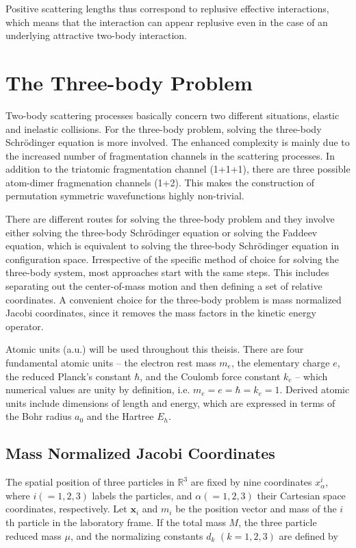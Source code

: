 \documentclass{article}
\numberwithin{equation}{section}
\numberwithin{figure}{section}
\begin{document}
Positive scattering lengths thus correspond to replusive effective interactions, which means that the interaction can appear replusive even in the case of an underlying attractive two-body interaction.

\section{The Three-body Problem} 
Two-body scattering processes basically concern two different situations, elastic and inelastic collisions. For the three-body problem, solving the three-body Schr{\"o}dinger equation is more involved. The enhanced complexity is mainly due to the increased number of fragmentation channels in the scattering processes. In addition to the triatomic fragmentation channel (1+1+1), there are three possible atom-dimer fragmenation channels (1+2). This makes the construction of permutation symmetric wavefunctions highly non-trivial. 

There are different routes for solving the three-body problem and they involve either solving the three-body Schr{\"o}dinger equation or solving the Faddeev equation, which is equivalent to solving the three-body Schr{\"o}dinger equation in configuration space. Irrespective of the specific method of choice for solving the three-body system, most approaches start with the same steps. This includes separating out the center-of-mass motion and then defining a set of relative coordinates. A convenient choice for the three-body problem is mass normalized Jacobi coordinates, since it removes the mass factors in the kinetic energy operator. 

Atomic units (a.u.) will be used throughout this theisis. There are four fundamental atomic units -- the electron rest mass $m_e$, the elementary charge $e$, the reduced Planck's constant $\hbar$, and the Coulomb force constant $k_e$ -- which numerical values are unity by definition, i.e. $m_e = e = \hbar = k_e = 1$. Derived atomic units include dimensions of length and energy, which are expressed in terms of the Bohr radius $a_0$ and the Hartree $E_h$.    

\subsection{Mass Normalized Jacobi Coordinates}\label{MNJC}
The spatial position of three particles in $\mathbb{R}^3$ are fixed by nine coordinates $x_{\alpha}^{i}$, where $i(=1,2,3)$ labels the particles, and $\alpha(=1,2,3)$ their Cartesian space coordinates, respectively. Let $\mathbf{x}_i$ and $m_{i}$ be the position vector and mass of the $i$th particle in the laboratory frame. If the total mass $M$, the three particle reduced mass $\mu$, and the normalizing constants $d_{k}$ $(k=1,2,3)$ are defined by
\end{document}
